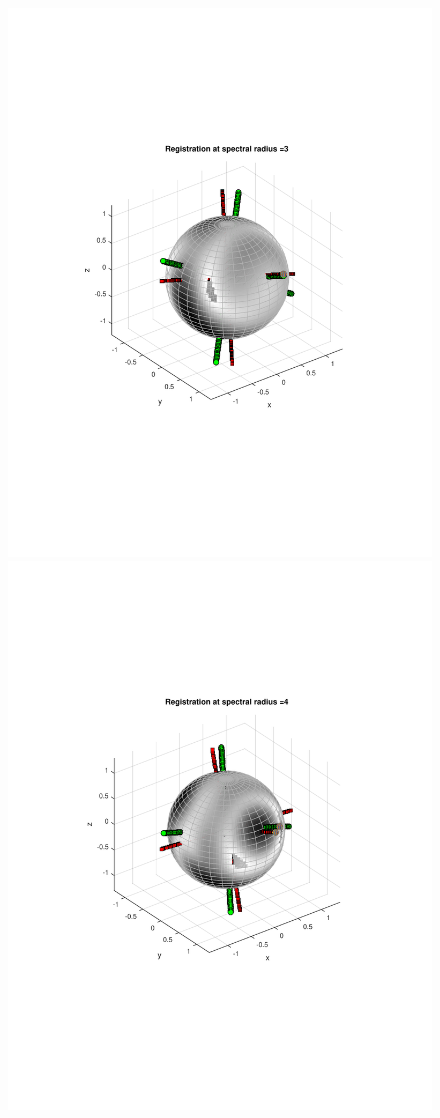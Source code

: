 \documentclass{UCF_ETD}
\begin{document}
\begin{figure}[H]
\begin{center}
\includegraphics[scale=0.38]{RobustRegistration/NoisyVolumeTransReg_3}
\includegraphics[scale=0.38]{RobustRegistration/NoisyVolumeTransReg_4}

\end{center}
\end{figure}
\end{document}

